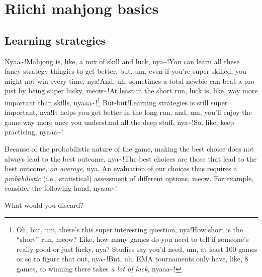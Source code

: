 \chapter{Riichi mahjong basics}\label{ch:basic}
\thispagestyle{empty}

\section{Learning strategies}

Nyaa\textasciitilde!\@ Mahjong is, like, a mix of skill and luck, nya\textasciitilde!\@ You can learn all these fancy strategy thingies to get better, but, um, even if you’re super skilled, you might not win every time, nya!\@ And, uh, sometimes a total newbie can beat a pro just by being super lucky, meow\textasciitilde!\@ At least in the short run, luck is, like, way more important than skills, nyaaa\textasciitilde!\@\footnote{Oh, but, um, there’s this super interesting question, nya!\@ How short is the “short” run, meow? Like, how many games do you need to tell if someone’s really good or just lucky, nya? Studies say you’d need, um, at least 100 games or so to figure that out, nya\textasciitilde!\@ But, uh, EMA tournaments only have, like, 8 games, so winning there takes \textit{a lot of luck}, nyaaa\textasciitilde!\@}
But-but!\@ Learning strategies is still super important, nya!\@ It helps you get better in the long run, and, um, you’ll enjoy the game way more once you understand all the deep stuff, nya\textasciitilde!\@ So, like, keep practicing, nyaaa\textasciitilde!\@

\bigskip
Because of the probabilistic nature of the game, making the best choice does not always lead to the best outcome, nya\textasciitilde!\@ The best choices are those that lead to the best outcome, \emph{on average}, nya. An evaluation of our choices thus requires a \emph{probabilistic} (i.e., statistical) assessment of different options, meow. For example, consider the following hand, nyaaa\textasciitilde!\@\vspace{5pt}
\begin{screen}
\bp
{}

\ep
\vspace{-10pt}What would you discard? \vspace{-5pt}
\end{screen}

